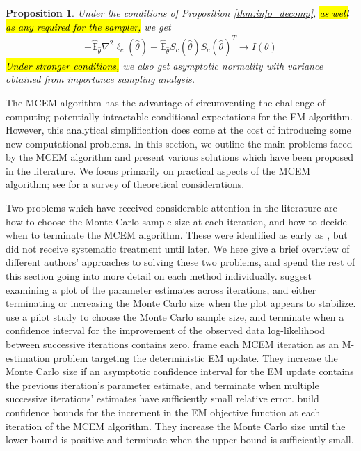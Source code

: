 \documentclass[11pt, oneside]{article}   	%
\newcommand{\bE}{\mathbb{E}}
\newtheorem{proposition}{Proposition}[section]
\begin{document}
\begin{proposition}
    Under the conditions of Proposition \ref{thm:info_decomp}, \hl{as well as any required for the sampler,} we get
    \begin{align}
        - \hat{\bE}_{\hat{\theta}} \nabla^2 \ell_c(\hat{\theta}) - \hat{\bE}_{\hat{\theta}} S_c(\hat{\theta}) S_c(\hat{\theta})^T \rightarrow I(\theta)
    \end{align}
    \hl{Under stronger conditions,} we also get asymptotic normality with variance obtained from importance sampling analysis.
\end{proposition}

The MCEM algorithm has the advantage of circumventing the challenge of computing potentially intractable conditional expectations for the EM algorithm. However, this analytical simplification does come at the cost of introducing some new computational problems. In this section, we outline the main problems faced by the MCEM algorithm and present various solutions which have been proposed in the literature. We focus primarily on practical aspects of the MCEM algorithm; see \citet{Nea13} for a survey of theoretical considerations.

Two problems which have received considerable attention in the literature are how to choose the Monte Carlo sample size at each iteration, and how to decide when to terminate the MCEM algorithm. These were identified as early as \citet{Wei90}, but did not receive systematic treatment until later. We here give a brief overview of different authors' approaches to solving these two problems, and spend the rest of this section going into more detail on each method individually. \citet{Wei90} suggest examining a plot of the parameter estimates across iterations, and either terminating or increasing the Monte Carlo size when the plot appears to stabilize. \citet{Cha95} use a pilot study to choose the Monte Carlo sample size, and terminate when a confidence interval for the improvement of the observed data log-likelihood between successive iterations contains zero. \citet{Boo99} frame each MCEM iteration as an M-estimation problem targeting the deterministic EM update. They increase the Monte Carlo size if an asymptotic confidence interval for the EM update contains the previous iteration's parameter estimate, and terminate when multiple successive iterations' estimates have sufficiently small relative error. \citet{Caf05} build confidence bounds for the increment in the EM objective function at each iteration of the MCEM algorithm. They increase the Monte Carlo size until the lower bound is positive and terminate when the upper bound is sufficiently small.
\end{document}
